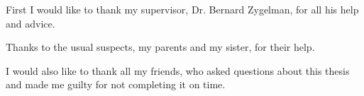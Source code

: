 
First I would like to thank my supervisor, Dr. Bernard Zygelman, for all his help and advice.

Thanks to the usual suspects, my parents and my sister, for their help.

I would also like to thank all my friends, who asked questions about this thesis and made me guilty for not completing it on time.

